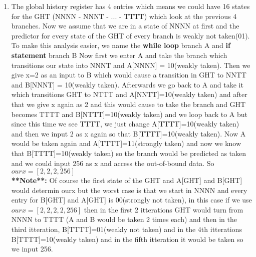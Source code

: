 \begin{enumerate}
\item The global history register has 4 entries which means we could have 16 states for the GHT (NNNN - NNNT - ... - TTTT) which look at the previous 4 
branches. Now we assume that we are in a state of NNNN at first and the predictor for every state of the GHT of every branch is weakly not taken(01). To make this 
analysis easier, we name the \textbf{while loop} branch A and \textbf{if statement} branch B
 Now first we enter A and take the branch which transitions our state into NNNT and A[NNNN] = 10(weakly taken). Then we give x=2 as an input to B which would cause 
 a transition in GHT to NNTT and B[NNNT] = 10(weakly taken). Afterwards we go back to A and take it which transitions GHT to NTTT and A[NNTT]=10(weakly taken) and after that we give 
 x again as 2 and this would cause to take the branch and GHT becomes TTTT and B[NTTT]=10(weakly taken) and we loop back to A but since this time we see TTTT, we just 
 change A[TTTT]=10(weakly taken) and then we input 2 as x again so that B[TTTT]=10(weakly taken). Now A would be taken again and A[TTTT]=11(strongly taken) and now we know that B[TTTT]=10(weakly taken) so the 
 branch would be predicted as taken and we could input 256 as x and access the out-of-bound data.
 So $ourx=[2, 2, 2, 256]$\\ 
 \textbf{**Note**:} Of course the first state of the GHT and A[GHT] and B[GHT] would determin ourx but the worst case 
 is that we start in NNNN and every entry for B[GHT] and A[GHT] is 00(strongly not taken), in this case if we use $ourx=[2,2,2,2,256]$ then in the first 2 
 itterations GHT would turn from NNNN to TTTT (A and B would be taken 2 times each) and then in the third itteration, B[TTTT]=01(weakly not taken) and in the 4th itterations B[TTTT]=10(weakly taken)
 and in the fifth itteration it would be taken so we input 256. 
\end{enumerate}